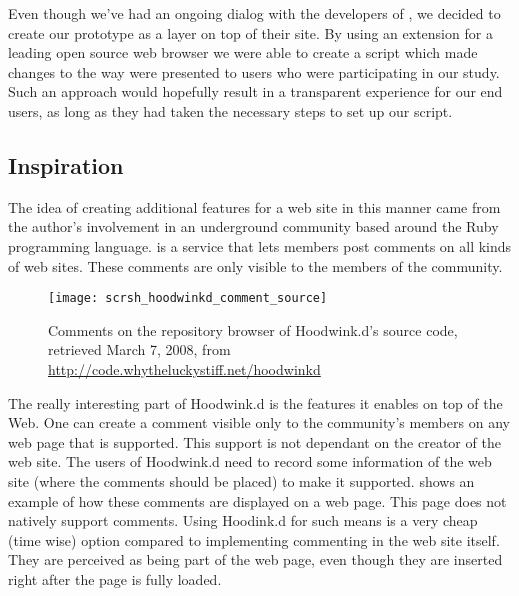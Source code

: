 Even though we've had an ongoing dialog with the developers of \urort{}, we
decided to create our prototype as a layer on top of their site.
By using an
extension
for a leading open source%
web browser we were able to create a script which
made changes to the way \urort{}
were presented to users who were participating in our study.
Such an approach would hopefully result in a transparent experience for our
end users, as long as they had taken the necessary steps to set up 
our script.

\subsection{Inspiration}

The idea of creating additional features for a web site in this manner
came from the author's involvement in an underground community based around
the Ruby programming language. %
is a service that lets members post comments on all kinds of
web sites. These comments are only visible to the members of the
community.

\begin{figure}
  \texttt{[image: scrsh\_hoodwinkd\_comment\_source]}
  \caption[Hoodwink.d Comments]{
    Comments on the repository browser of Hoodwink.d's source code,
    retrieved March 7, 2008, from
    \url{http://code.whytheluckystiff.net/hoodwinkd}
  }
  \label{figure:scrsh.hoodwinkd.comment.source}
\end{figure}

The really interesting part of Hoodwink.d is the features
it enables on top of the Web. One can create a comment visible only to the
community's members on any web page that is supported. This support is not
dependant on the creator of the web site. The users of Hoodwink.d need to
record some information of the web site (where the comments should be placed)
to make it supported.  shows an
example of how these comments are displayed on a web page.
This page does not natively support
comments. Using Hoodink.d for such means is a very cheap (time wise) option
compared to implementing commenting in the web site itself.
They are perceived as being part of the web page, even though they
are inserted right after the page is fully loaded.

